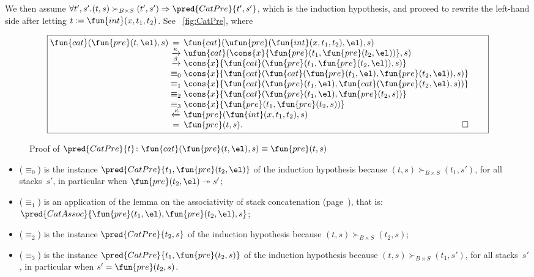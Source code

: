 We then assume \(\forall t',s'.(t,s) \succ_{B \times S} (t',s')
\Rightarrow \pred{CatPre}{t',s'}\), which is the induction hypothesis,
and proceed to rewrite the left\hyp{}hand side after letting \(t :=
\fun{int}(x,t_1,t_2)\). See \fig~\vref{fig:CatPre}, where
\begin{figure}[t]
\begin{equation*}
\boxed{%
\begin{array}{@{}r@{\;}c@{\;}l@{\qquad}}
  \fun{cat}(\fun{pre}(t,\el),s)
& =
& \fun{cat}(\ufun{pre}(\fun{int}(x,t_1,t_2),\el),s)\\
& \xrightarrow{\smash{\kappa}}
& \ufun{cat}(\cons{x}{\fun{pre}(t_1,\fun{pre}(t_2,\el))},s)\\
& \xrightarrow{\smash{\beta}}
& \cons{x}{\fun{cat}(\fun{pre}(t_1,\fun{pre}(t_2,\el)),s)}\\
& \equiv_0
& \cons{x}{\fun{cat}(\fun{cat}(\fun{pre}(t_1,\el),\fun{pre}(t_2,\el)),s)}\\
& \equiv_1
& \cons{x}{\fun{cat}(\fun{pre}(t_1,\el),\fun{cat}(\fun{pre}(t_2,\el),s))}\\
& \equiv_2
& \cons{x}{\fun{cat}(\fun{pre}(t_1,\el),\fun{pre}(t_2,s))}\\
& \equiv_3
& \cons{x}{\fun{pre}(t_1,\fun{pre}(t_2,s))}\\
& \xleftarrow{\smash{\kappa}}
& \fun{pre}(\fun{int}(x,t_1,t_2),s)\\
& =
& \fun{pre}(t,s). \hfill\Box
\end{array}}
\end{equation*}
\caption{Proof of \(\pred{CatPre}{t} \colon
  \fun{cat}(\fun{pre}(t,\el),s) \equiv
  \fun{pre}(t,s)\)}
\label{fig:CatPre}
\end{figure}
\begin{itemize}

  \item (\(\equiv_0\)) is the instance
  \(\pred{CatPre}{t_1,\fun{pre}(t_2,\el)}\) of the induction
  hypothesis because \((t,s) \succ_{B \times S} (t_1,s')\), for all
  stacks~\(s'\), in particular when \(\fun{pre}(t_2,\el)
  \twoheadrightarrow s'\);

  \item (\(\equiv_1\)) is an application of the lemma on the
  associativity of stack concatenation
  (page~\pageref{proof:assoc_cat}), that is:
  \(\pred{CatAssoc}{\fun{pre}(t_1,\el),\fun{pre}(t_2,\el),s}\);

  \item (\(\equiv_2\)) is the instance
  \(\pred{CatPre}{t_2,s}\) of the
  induction hypothesis because \((t,s) \succ_{B \times S} (t_2,s)\);

  \item (\(\equiv_3\)) is the instance \(\pred{CatPre}{t_1,
    \fun{pre}(t_2,s)}\) of the induction hypothesis because \((t,s)
    \succ_{B \times S} (t_1,s')\), for all stacks~\(s'\), in
    particular when \(s' = \fun{pre}(t_2,s)\).
\end{itemize}
